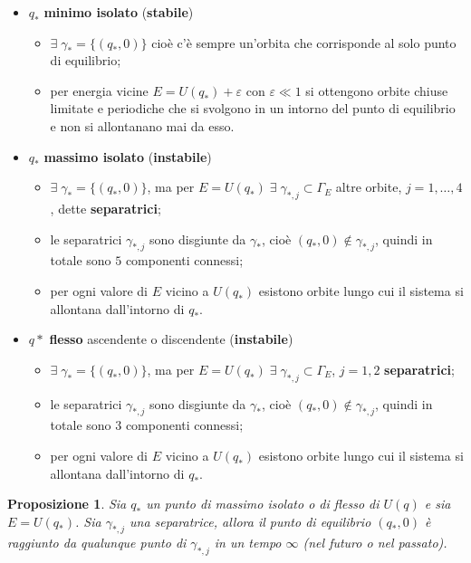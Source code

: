 \documentclass{book}
\theoremstyle{plain}
\theoremstyle{plain}
\theoremstyle{plain}
\theoremstyle{plain}
\theoremstyle{plain}
\newtheorem{prop}{Proposizione}[chapter]
\theoremstyle{definition}
\theoremstyle{remark}
\theoremstyle{definition}
\begin{document}
\begin{itemize}
    \item $q_*$ \textbf{minimo isolato} (\textbf{stabile})
    \begin{itemize}
        \item $\exists \; \gamma_*=\{(q_*, 0)\}$ cioè c'è sempre un'orbita che corrisponde al solo punto di equilibrio;
        \item per energia vicine $E=U(q_*)+\varepsilon$ con $\varepsilon\ll1$ si ottengono orbite chiuse limitate e periodiche che si svolgono in un intorno del punto di equilibrio e non si allontanano mai da esso.
    \end{itemize}
    \item $q_*$ \textbf{massimo isolato} (\textbf{instabile})
    \begin{itemize}
        \item $\exists \; \gamma_*=\{(q_*,0)\}$, ma per $E=U(q_*) \; \exists \; \gamma_{*, j} \subset \Gamma_E$ altre orbite, $j=1, \ldots, 4$, dette \textbf{separatrici};
        \item le separatrici $\gamma_{*, j}$ sono disgiunte da $\gamma_*$, cioè $(q_*, 0) \notin \gamma_{*, j}$, quindi in totale sono $5$ componenti connessi;
        \item per ogni valore di $E$ vicino a $U(q_*)$ esistono orbite lungo cui il sistema si allontana dall'intorno di $q_*$.
    \end{itemize}
    \item $q*$ \textbf{flesso} ascendente o discendente (\textbf{instabile})
    \begin{itemize}
        \item $\exists \; \gamma_*=\{(q_*,0)\}$, ma per $E=U(q_*) \; \exists \; \gamma_{*, j} \subset \Gamma_E$, $j=1, 2$ \textbf{separatrici};
        \item le separatrici $\gamma_{*, j}$ sono disgiunte da $\gamma_*$, cioè $(q_*, 0) \notin \gamma_{*, j}$, quindi in totale sono $3$ componenti connessi;
        \item per ogni valore di $E$ vicino a $U(q_*)$ esistono orbite lungo cui il sistema si allontana dall'intorno di $q_*$.
    \end{itemize}
\end{itemize}

\begin{prop}
    Sia $q_*$ un punto di massimo isolato o di flesso di $U(q)$ e sia $E=U(q_*)$. Sia $\gamma_{*, j}$ una separatrice, allora il punto di equilibrio $(q_*, 0)$ è raggiunto da qualunque punto di $\gamma_{*, j}$ in un tempo $\infty$ (nel futuro o nel passato).
\end{prop}
\end{document}
